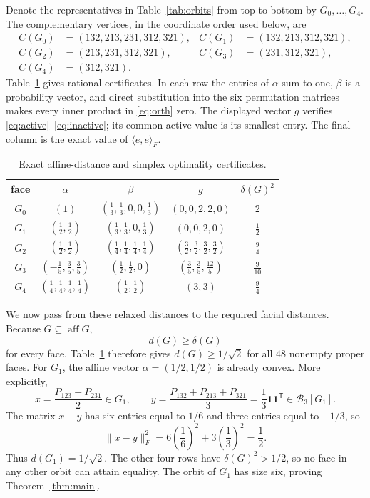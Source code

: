 \documentclass[11pt]{article}
\DeclareMathOperator{\aff}{aff}
\begin{document}
Denote the representatives in Table~\ref{tab:orbits} from top to bottom by
$G_0,\ldots,G_4$.  The complementary vertices, in the coordinate order used
below, are
\begin{align*}
 C(G_0)&=(132,213,231,312,321),&
 C(G_1)&=(132,213,312,321),\\
 C(G_2)&=(213,231,312,321),&
 C(G_3)&=(231,312,321),\\
 C(G_4)&=(312,321).&&
\end{align*}
Table~\ref{tab:certificates} gives rational certificates.  In each row the
entries of $\alpha$ sum to one, $\beta$ is a probability vector, and direct
substitution into the six permutation matrices makes every inner product in
\eqref{eq:orth} zero.  The displayed vector $g$ verifies
\eqref{eq:active}--\eqref{eq:inactive}; its common active value is its
smallest entry.  The final column is the exact value of
$\langle e,e\rangle_F$.

\begin{table}[ht]
\centering
\caption{Exact affine-distance and simplex optimality certificates.}
\label{tab:certificates}
\setlength{\tabcolsep}{3.5pt}
\small
\begin{tabular}{@{}ccccc@{}}
\toprule
face & $\alpha$ & $\beta$ & $g$ & $\delta(G)^2$ \\
\midrule
$G_0$ & $(1)$
& $(\frac13,\frac13,0,0,\frac13)$
& $(0,0,2,2,0)$ & $2$ \\
$G_1$ & $(\frac12,\frac12)$
& $(\frac13,\frac13,0,\frac13)$
& $(0,0,2,0)$ & $\frac12$ \\
$G_2$ & $(\frac12,\frac12)$
& $(\frac14,\frac14,\frac14,\frac14)$
& $(\frac32,\frac32,\frac32,\frac32)$ & $\frac94$ \\
$G_3$ & $(-\frac15,\frac35,\frac35)$
& $(\frac12,\frac12,0)$
& $(\frac35,\frac35,\frac{12}5)$ & $\frac9{10}$ \\
$G_4$ & $(\frac14,\frac14,\frac14,\frac14)$
& $(\frac12,\frac12)$
& $(3,3)$ & $\frac94$ \\
\bottomrule
\end{tabular}
\end{table}

We now pass from these relaxed distances to the required facial distances.
Because $G\subseteq\aff G$,
\[
 d(G)\geq\delta(G)
\]
for every face.  Table~\ref{tab:certificates} therefore gives
$d(G)\geq1/\sqrt2$ for all $48$ nonempty proper faces.  For $G_1$, the
affine vector $\alpha=(1/2,1/2)$ is already convex.  More explicitly,
\[
 x=\frac{P_{123}+P_{231}}2\in G_1,
 \qquad
 y=\frac{P_{132}+P_{213}+P_{321}}3
   =\frac13\mathbf1\mathbf1^{\mathsf T}\in\mathcal B_3[G_1].
\]
The matrix $x-y$ has six entries equal to $1/6$ and three entries equal to
$-1/3$, so
\[
 \|x-y\|_F^2=6\left(\frac16\right)^2+
                  3\left(\frac13\right)^2=\frac12.
\]
Thus $d(G_1)=1/\sqrt2$.  The other four rows have
$\delta(G)^2>1/2$, so no face in any other orbit can attain equality.  The
orbit of $G_1$ has size six, proving Theorem~\ref{thm:main}.
\end{document}
